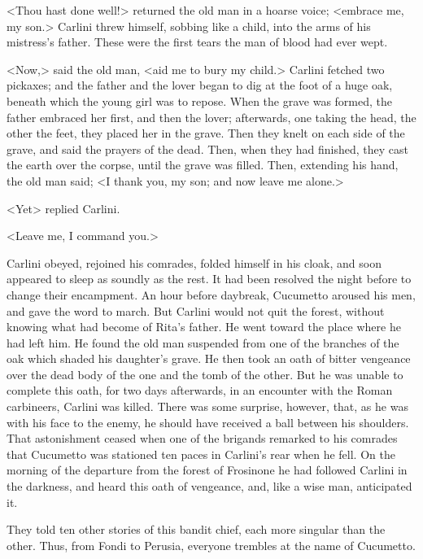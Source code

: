 {<Thou hast done well!> returned the old man in a hoarse voice; <embrace me, my son.>  Carlini threw himself, sobbing like a child, into the arms of his mistress's father. These were the first tears the man of blood had ever wept. 

<Now,> said the old man, <aid me to bury my child.> Carlini fetched two pickaxes; and the father and the lover began to dig at the foot of a huge oak, beneath which the young girl was to repose. When the grave was formed, the father embraced her first, and then the lover; afterwards, one taking the head, the other the feet, they placed her in the grave. Then they knelt on each side of the grave, and said the prayers of the dead. Then, when they had finished, they cast the earth over the corpse, until the grave was filled. Then, extending his hand, the old man said; <I thank you, my son; and now leave me alone.> 

<Yet\longdash> replied Carlini. 

<Leave me, I command you.> 

Carlini obeyed, rejoined his comrades, folded himself in his cloak, and soon appeared to sleep as soundly as the rest. It had been resolved the night before to change their encampment. An hour before daybreak, Cucumetto aroused his men, and gave the word to march. But Carlini would not quit the forest, without knowing what had become of Rita's father. He went toward the place where he had left him. He found the old man suspended from one of the branches of the oak which shaded his daughter's grave. He then took an oath of bitter vengeance over the dead body of the one and the tomb of the other. But he was unable to complete this oath, for two days afterwards, in an encounter with the Roman carbineers, Carlini was killed. There was some surprise, however, that, as he was with his face to the enemy, he should have received a ball between his shoulders. That astonishment ceased when one of the brigands remarked to his comrades that Cucumetto was stationed ten paces in Carlini's rear when he fell. On the morning of the departure from the forest of Frosinone he had followed Carlini in the darkness, and heard this oath of vengeance, and, like a wise man, anticipated it. 

They told ten other stories of this bandit chief, each more singular than the other. Thus, from Fondi to Perusia, everyone trembles at the name of Cucumetto. 

}
